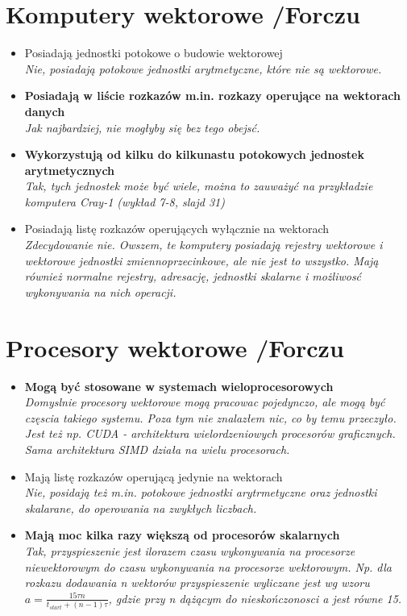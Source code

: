\documentclass[a4paper,twoside]{article}
\begin{document}
\section{Komputery wektorowe  {\small /Forczu}}
	\begin{itemize}
    \item Posiadają jednostki potokowe o budowie wektorowej\\
    {\small \emph{Nie, posiadają potokowe jednostki arytmetyczne, które nie są wektorowe.}}
    \item \textbf{Posiadają w liście rozkazów m.in. rozkazy operujące na wektorach danych}\\
    {\small \emph{Jak najbardziej, nie mogłyby się bez tego obejsć.}}
    \item \textbf{Wykorzystują od kilku do kilkunastu potokowych jednostek arytmetycznych}\\
    {\small \emph{Tak, tych jednostek może być wiele, można to zauważyć na przykładzie komputera Cray-1 (wykład 7-8, slajd 31)}}
    \item Posiadają listę rozkazów operujących wyłącznie na wektorach\\
    {\small \emph{Zdecydowanie nie. Owszem, te komputery posiadają rejestry wektorowe i wektorowe jednostki zmiennoprzecinkowe, ale nie jest to wszystko. Mają również normalne rejestry, adresację, jednostki skalarne i możliwosć wykonywania na nich operacji.}}
    \end{itemize}

\section{Procesory wektorowe {\small /Forczu}}
	\begin{itemize}
    \item \textbf{Mogą być stosowane w systemach wieloprocesorowych}\\
    {\small \emph{Domyslnie procesory wektorowe mogą pracowac pojedynczo, ale mogą być częscia takiego systemu. Poza tym nie znalazłem nic, co by temu przeczyło. Jest też np. CUDA - architektura wielordzeniowych procesorów graficznych. Sama architektura SIMD działa na wielu procesorach.}}
    \item Mają listę rozkazów operującą jedynie na wektorach\\
    {\small \emph{Nie, posidają też m.in. potokowe jednostki arytrmetyczne oraz jednostki skalarane, do operowania na zwykłych liczbach.}}
    \item \textbf{Mają moc kilka razy większą od procesorów skalarnych}\\
    {\small \emph{Tak, przyspieszenie jest ilorazem czasu wykonywania na procesorze niewektorowym do czasu wykonywania na procesorze wektorowym. Np. dla rozkazu dodawania \emph{n} wektorów przyspieszenie wyliczane jest wg wzoru $ a=\frac{15\tau n}{t_{start}+(n-1)\tau} $, gdzie przy \emph{n} dążącym do nieskończonosci \emph{a} jest równe 15.}}
    \end{itemize}
\end{document}
